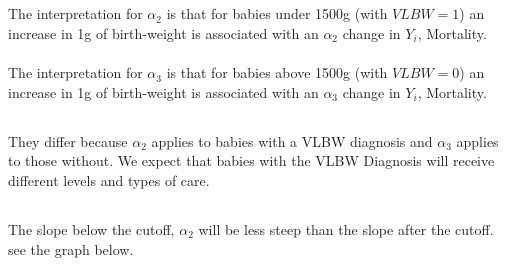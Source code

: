 \documentclass[11pt]{article}
\begin{document}
\subsection{}
The interpretation for $\alpha_2$ is that for babies under 1500g (with $VLBW = 1$) an increase in 1g of birth-weight is associated with an $\alpha_2$ change in $Y_i$, Mortality. 
\\
\\
The interpretation for $\alpha_3$ is that for babies above 1500g (with $VLBW = 0$) an increase in 1g of birth-weight is associated with an $\alpha_3$ change in $Y_i$, Mortality.

\subsection{}

They differ because $\alpha_2$ applies to babies with a VLBW diagnosis and $\alpha_3$ applies to those without. We expect that babies with the VLBW Diagnosis will receive different levels and types of care. 

\subsection{}

The slope below the cutoff, $\alpha_2$ will be less steep than the slope after the cutoff. 
see the graph below. \\
\\ \\ \\ \\ \\ \\ \\ \\ \\ \\ \\ \\ \\ \\ \\ \\ \\ \\ \\ \\ \\ \\ 
\end{document}
